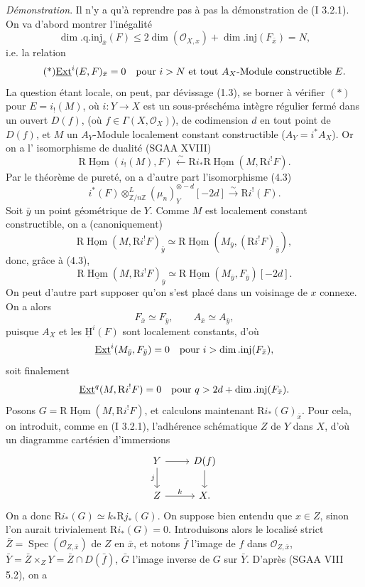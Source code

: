 \documentclass[11pt]{article}
\providecommand{\uH}{\underline{\mathrm H}}
\DeclareMathOperator{\Hom}{Hom}
\DeclareMathOperator{\Ext}{Ext}
\DeclareMathOperator{\Spec}{Spec}
\newcommand{\R}{\mathrm{R}}\newcommand{\RHomCore}{\mathrm{RHom}}
\newcommand{\Z}{\mathbb{Z}}
\providecommand{\Hom}{\operatorname{Hom}}
\providecommand{\R}{\mathrm R}
\providecommand{\Z}{\mathbb Z}
\providecommand{\Spec}{\operatorname{Spec}}
\providecommand{\Spec}{\operatorname{Spec}}
\providecommand{\Hom}{\operatorname{Hom}}
\providecommand{\Spec}{\operatorname{Spec}}
\providecommand{\Spec}{\operatorname{Spec}}
\begin{document}
\emph{Démonstration}. Il n'y a qu'à reprendre pas à pas la démonstration de (I 3.2.1). On va d'abord montrer l'inégalité
\[
        \dim.\mathrm{q.inj}_{\bar{x}}(F)\leq 2\dim(\mathcal{O}_{X,x})+\dim.\mathrm{inj}(F_{\bar{x}})=N,
\]
i.e. la relation
\begin{equation}\tag{*}
        \underline{\Ext}^{i}(E,F)_{\bar{x}}=0\quad\hbox{pour } i>N\hbox{ et tout }A_X\hbox{-Module constructible }E.
\end{equation}
La question étant locale, on peut, par dévissage (1.3), se borner à vérifier $(*)$ pour $E=i_!(M)$, où $i:Y\to X$ est un sous-préschéma intègre régulier fermé dans un ouvert $D(f)$, (où $f\in\Gamma(X,\mathcal{O}_X)$), de codimension $d$ en tout point de $D(f)$, et $M$ un $A_Y$-Module localement constant constructible ($A_Y=i^*A_X$).
Or on a l'%
isomorphisme de dualité (SGAA XVIII)
\[
        \R\underline{\Hom}(i_!(M),F)\xleftarrow{\sim} \R i_*\R\underline{\Hom}(M,\R i^!F).
\]
Par le théorème de pureté, on a d'autre part l'isomorphisme (4.3)
\[
        i^*(F)\otimes^L_{\Z/n\Z}(\mu_n)_Y^{\otimes -d}[-2d]\xrightarrow{\sim}\R i^!(F).
\]
Soit $\bar{y}$ un point géométrique de $Y$. Comme $M$ est localement constant constructible, on a (canoniquement)
\[
        \R\underline{\Hom}(M,\R i^!F)_{\bar{y}}\simeq \R\underline{\Hom}(M_{\bar{y}},(\R i^!F)_{\bar{y}}),
\]
donc, grâce à (4.3),
\[
        \R\underline{\Hom}(M,\R i^!F)_{\bar{y}}\simeq \R\underline{\Hom}(M_{\bar{y}},F_{\bar{y}})[-2d].
\]
On peut d'autre part supposer qu'on s'est placé dans un voisinage de $x$ connexe. On a alors
\[
        F_{\bar{x}}\simeq F_{\bar{y}},\qquad A_{\bar{x}}\simeq A_{\bar{y}},
\]
puisque $A_X$ et les $\uH^i(F)$ sont localement constants, d'où
\[
        \underline{\Ext}^i(M_{\bar{y}},F_{\bar{y}})=0\quad\hbox{pour }i>\dim.\mathrm{inj}(F_{\bar{x}}),
\]
soit finalement
\[
        \underline{\Ext}^{q}(M,\R i^!F)=0\quad\hbox{pour }q>2d+\dim.\mathrm{inj}(F_{\bar{x}}).
\]
Posons $G=\R\underline{\Hom}(M,\R i^!F)$, et calculons maintenant $\R i_*(G)_{\bar{x}}$. Pour cela, on introduit, comme en (I 3.2.1), l'adhérence schématique $Z$ de $Y$ dans $X$, d'où un diagramme cartésien d'immersions
\[
\begin{tikzcd}
Y \arrow[r] \arrow[d,"j"'] & D(f) \arrow[d]\\
Z \arrow[r,"k"] & X.
\end{tikzcd}
\]
On a
donc $\R i_*(G)\simeq k_*\R j_*(G)$. On suppose bien entendu que $x\in Z$, sinon l'on aurait trivialement $\R i_*(G)=0$. Introduisons alors le localisé strict $\bar{Z}=\Spec(\mathcal{O}_{Z,\bar{x}})$ de $Z$ en $\bar{x}$, et notons $\bar{f}$ l'image de $f$ dans $\mathcal{O}_{Z,\bar{x}}$, $\bar{Y}=\bar{Z}\times_ZY=\bar{Z}\cap D(\bar{f})$, $\bar{G}$ l'image inverse de $G$ sur $\bar{Y}$. D'après (SGAA VIII 5.2), on a
\end{document}
